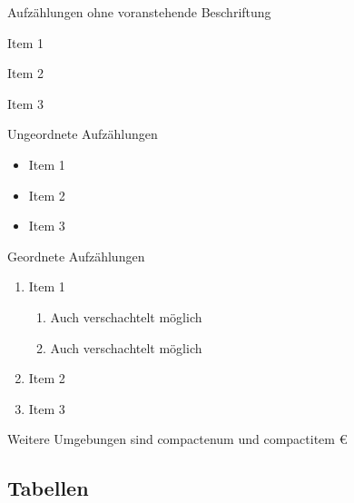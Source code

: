 \documentclass[\mainsize, a4paper, fleqn, xcolor=dvipsnames]{scrartcl}
\begin{document}
	Aufzählungen ohne voranstehende Beschriftung
	
	\begin{description}
		\item{Item 1}
		\item{Item 2}
		\item{Item 3}
	\end{description}
	
	Ungeordnete Aufzählungen
	
	\begin{itemize}
		\item{Item 1}
		\item{Item 2}
		\item{Item 3}
	\end{itemize}
	
	Geordnete Aufzählungen 
	
	\begin{enumerate} %
		\item{Item 1}
		\begin{enumerate}
			\item Auch verschachtelt möglich
			\item Auch verschachtelt möglich
		\end{enumerate}
		\item{Item 2}
		\item{Item 3}
	\end{enumerate}
	
	Weitere Umgebungen sind compactenum und compactitem
	\euro{}
	
	\subsection{Tabellen}\label{subsec:tables}
	
	
	
\end{document}
